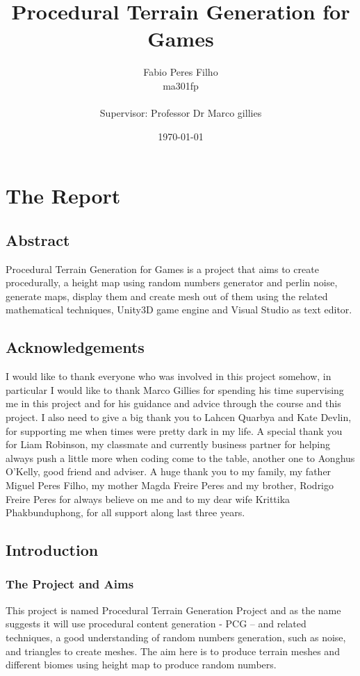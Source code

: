\documentclass[a4paper,12pt]{book}
\title{Procedural Terrain Generation for Games}
\author{Fabio Peres Filho\\ma301fp\\ \\Supervisor: Professor Dr Marco gillies}
\date{\today}                                           %
\begin{document}
\maketitle
\def\thepage{\roman{page}}
\part{The Report}
\chapter*{Abstract}
Procedural Terrain Generation for Games is a project that aims to create procedurally, a height map using random numbers generator and perlin noise, generate maps, display them and create mesh out of them using the related mathematical techniques, Unity3D game engine and Visual Studio as text editor. 

\newpage

\chapter*{Acknowledgements}
I would like to thank everyone who was involved in this project somehow, in particular I would like to thank Marco Gillies for spending his time supervising me in this project and for his guidance and advice through the course and this project. I also need to give a big thank you to Lahcen Quarbya and Kate Devlin, for supporting me when times were pretty dark in my life. A special thank you for Liam Robinson, my classmate and currently business partner for helping always push a little more when coding come to the table, another one to Aonghus O’Kelly, good friend and adviser.
A huge thank you to my family, my father Miguel Peres Filho, my mother Magda Freire Peres and my brother, Rodrigo Freire Peres for always believe on me and to my dear wife Krittika Phakbunduphong, for all support along last three years. 


\tableofcontents
\listoffigures
\listoftables

\chapter{Introduction}
\def\thepage{\arabic{page}}
\setcounter{page}{1}

\section{The Project and Aims}


This project is named Procedural Terrain Generation Project and as the name suggests it will use procedural content generation - PCG – and related techniques, a good understanding of random numbers generation, such as noise, and triangles to create meshes. The aim here is to produce terrain meshes and different biomes using height map to produce random numbers. 
\end{document}
